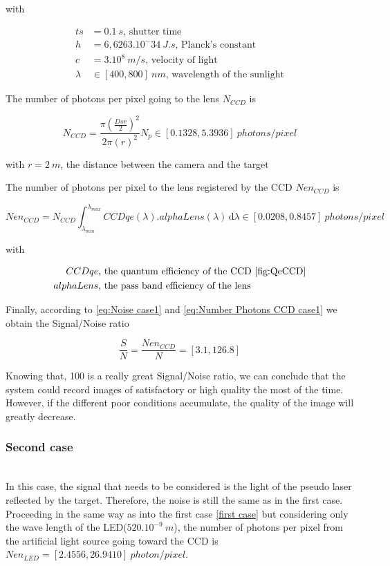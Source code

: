with

\begin{align*}
ts & = 0.1\ s \mbox{, shutter time}  \\
h & = 6,6263.10^-34 \ J.s \mbox{, Planck's constant}  \\
c & = 3.10^8 \ m/s \mbox{, velocity of light} \\
\lambda & \in [400, 800] \ nm \mbox{, wavelength of the sunlight}
\end{align*}

The number of photons per pixel going to the lens $N_{CCD}$ is

\begin{equation}
\label{eq:Number Photons case1}
N_{CCD}=\frac{\pi\left(\frac{Dsr}{2}\right)^2}{2\pi(r)^2}N_p \in [0.1328, 5.3936] \ photons/pixel
\end{equation}

with $r = 2\ m$, the distance between the camera and the target

The number of photons per pixel to the lens registered by the CCD $Nen_{CCD}$ is

\begin{equation}
\label{eq:Number Photons CCD case1}
Nen_{CCD}= N_{CCD}\int_{\lambda_{min}}^{\lambda_{max}}CCDqe(\lambda).alphaLens(\lambda) \, \mathrm d\lambda \in [0.0208, 0.8457] \ photons/pixel
\end{equation}

with

\begin{align*}
CCDqe & \mbox{, the quantum efficiency of the CCD \ref{fig:QeCCD}}\\
alphaLens & \mbox{, the pass band efficiency of the lens}
\end{align*}

Finally, according to \eqref{eq:Noise case1} and \eqref{eq:Number Photons CCD case1} we obtain the Signal/Noise ratio 

\begin{equation}
\label{eq:Signal Noise Ratio case1}
\frac{S}{N} = \frac{Nen_{CCD}}{N} = [3.1, 126.8]
\end{equation}

Knowing that, 100 is a really great Signal/Noise ratio, we can conclude that the system could record images of satisfactory or high quality the most of the time. However, if the different poor conditions accumulate, the quality of the image will greatly decrease.

\subsubsection{Second case}
~\\
In this case, the signal that needs to be considered is the light of the pseudo laser reflected by the target. Therefore, the noise is still the same as in the first case.
Proceeding in the same way as into the first case \ref{first case} but considering only the wave length of the LED($520.10^{-9}\ m$), the number of photons per pixel from the artificial light source going toward the CCD is $Nen_{LED} = [2.4556, 26.9410]\ photon/pixel$.

